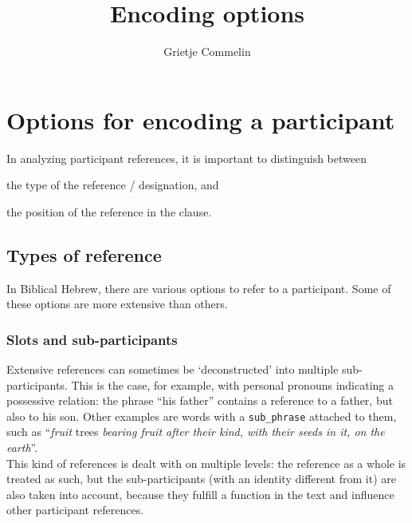 \documentclass{report}
\title{Encoding options}
\author{Grietje Commelin}
\newcommand{\mi}[1]{\lstinline{#1}}
\begin{document}
\maketitle


\section{Options for encoding a participant}

In analyzing participant references, it is important to distinguish between
\begin{enumerate*}[label=\itshape\alph*\upshape)]
\item the type of the reference / designation, and
\item the position of the reference in the clause.
\end{enumerate*}

\subsection{Types of reference}
In Biblical Hebrew, there are various options to refer to a participant. Some of these options are more extensive than others.


\subsubsection{Slots and sub-participants}
Extensive references can sometimes be `deconstructed' into multiple sub-participants. This is the case, for example, with personal pronouns indicating a possessive relation: the phrase ``his father'' contains a reference to a father, but also to his son. Other examples are words with a \mi{sub_phrase} attached to them, such as ``\emph{fruit} trees \emph{bearing fruit after their kind, with their seeds in it, on the earth}''.\\
This kind of references is dealt with on multiple levels: the reference as a whole is treated as such, but the sub-participants (with an identity different from it) are also taken into account, because they fulfill a function in the text and influence other participant references.
\end{document}
